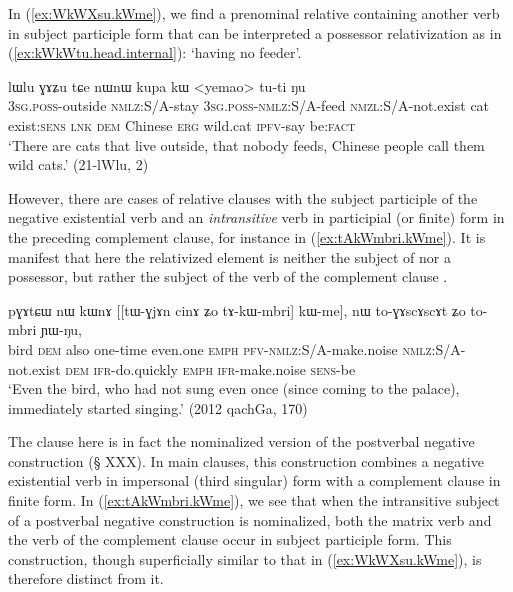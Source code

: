 In (\ref{ex:WkWXsu.kWme}), we find a prenominal relative containing another verb in subject participle form that can be interpreted a possessor relativization as in (\ref{ex:kWkWtu.head.internal}):   `having no feeder'.

\begin{exe}
\ex \label{ex:WkWXsu.kWme}
  lɯlu ɣɤʑu tɕe nɯnɯ kupa kɯ <yemao> tu-ti ŋu \\
 \textsc{3sg}.\textsc{poss}-outside \textsc{nmlz}:S/A-stay \textsc{3sg}.\textsc{poss}-\textsc{nmlz}:S/A-feed \textsc{nmzl}:S/A-not.exist cat exist:\textsc{sens} \textsc{lnk} \textsc{dem} Chinese \textsc{erg} wild.cat \textsc{ipfv}-say be:\textsc{fact} \\
 \glt `There are cats that live outside, that nobody feeds, Chinese people call them wild cats.' (21-lWlu, 2)
 \end{exe}

However, there are cases of relative clauses with the subject participle of the negative existential verb  and an \textit{intransitive} verb in participial (or finite) form in the preceding complement clause, for instance  in (\ref{ex:tAkWmbri.kWme}). It is manifest that here the relativized element is neither the subject of  nor a possessor, but rather the subject of the verb of the complement clause .

  \begin{exe}
\ex \label{ex:tAkWmbri.kWme}
 \gll  pɣɤtɕɯ nɯ kɯnɤ [[tɯ-ɣjɤn cinɤ ʑo tɤ-kɯ-mbri] kɯ-me], nɯ to-ɣɤscɤscɤt ʑo to-mbri ɲɯ-ŋu, \\
bird \textsc{dem} also one-time even.one \textsc{emph} \textsc{pfv}-\textsc{nmlz}:S/A-make.noise \textsc{nmlz}:S/A-not.exist \textsc{dem} \textsc{ifr}-do.quickly \textsc{emph} \textsc{ifr}-make.noise \textsc{sens}-be \\
\glt `Even the bird, who had not sung even once (since coming to the palace), immediately started singing.' (2012 qachGa, 170)
 \end{exe}

The clause  here is in fact the nominalized version of the postverbal negative construction  (§ XXX). In main clauses, this construction combines a negative existential verb in impersonal (third singular) form with a complement clause in finite form. In (\ref{ex:tAkWmbri.kWme}), we see that when the intransitive subject of a postverbal negative construction is nominalized, both the matrix verb  and the verb of the complement clause  occur in subject participle form. This construction, though superficially similar to that in (\ref{ex:WkWXsu.kWme}), is therefore distinct from it.
 
